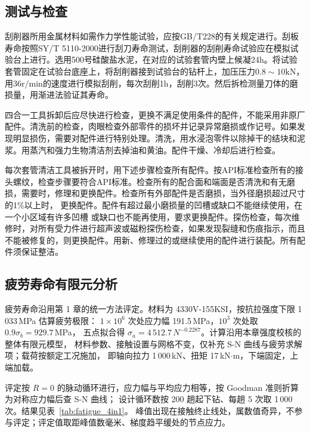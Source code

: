 \subsection{测试与检查}

刮削器所用金属材料如需作力学性能试验，应按GB/T228的有关规定进行。刮板寿命按照SY/T 5110-2000进行刮刀寿命测试，刮削器的刮削寿命试验应在模拟试验台上进行。选用500号硅酸盐水泥，在对应的试验套管内壁上候凝24h。将试验套管固定在试验台底座上，将刮削器接到试验台的钻杆上，加压压力$0.8\sim10\mathrm{kN}$，用$36\mathrm{r/min}$的速度进行模拟刮削，每次刮削1h，刮削3次。然后拆检测量刀体的磨损量，用渐进法验证其寿命。

四合一工具拆卸后应尽快进行检查，更换不满足使用条件的配件，不能采用非原厂配件。清洗前的检查，肉眼检查外部零件的损坏并记录异常磨损或作记号。如果发现明显损伤，需要对配件进行特别处理。清洗，用水浸泡零件以除掉干的结块和泥浆。用蒸汽和强力生物清洁剂去掉油和黄油。配件干燥、冷却后进行检查。

每次套管清洁工具被拆开时，用下述步骤检查所有配件。按API标准检查所有的接头螺纹，检查步骤要符合API标准。检查所有的配合面和端面是否清洗和有无磨损，需要时，修理和更换配件。检查所有外部配件是否磨损，当外径磨损超过尺寸的1\%以上时， 更换配件。配件有超过最小磨损量的凹槽或缺口不能继续使用，在一个小区域有许多凹槽 或缺口也不能再使用，要求更换配件。探伤检查，每次维修时，对所有受力件进行超声波或磁粉探伤检查，如果发现裂缝和伤痕指示，而且不能被修复的，则更换配件。用新、修理过的或继续使用的配件进行装配。所有配件须保证整洁。



\subsection{疲劳寿命有限元分析}
疲劳寿命沿用第 1 章的统一方法评定。材料为 4330V-155KSI，按抗拉强度下限 1\,033\,MPa 估算疲劳极限：
$1\times10^{6}$ 次处应力幅 191.5\,MPa，$10^{3}$ 次处取 $0.9\sigma_b=929.7$\,MPa，
五点拟合得 $\sigma_a=4\,512.7\,N^{-0.2287}$。计算沿用本章强度校核的整体有限元模型，
材料参数、接触设置与网格不变，仅补充 S-N 曲线与疲劳求解项；载荷按额定工况施加，
即轴向拉力 1\,000\,kN、扭矩 17\,kN$\cdot$m，下端固定，上端加载。

评定按 $R=0$ 的脉动循环进行，应力幅与平均应力相等，按 Goodman 准则折算为对称应力幅后查 S-N 曲线；
设计循环数按 200 趟起下钻、每趟 5 次取 1\,000 次。结果见表~\ref{tab:fatigue_4in1}。
峰值出现在接触终止线处，属数值奇异，不参与评定；评定值取距峰值数毫米、梯度趋平缓处的节点应力。

